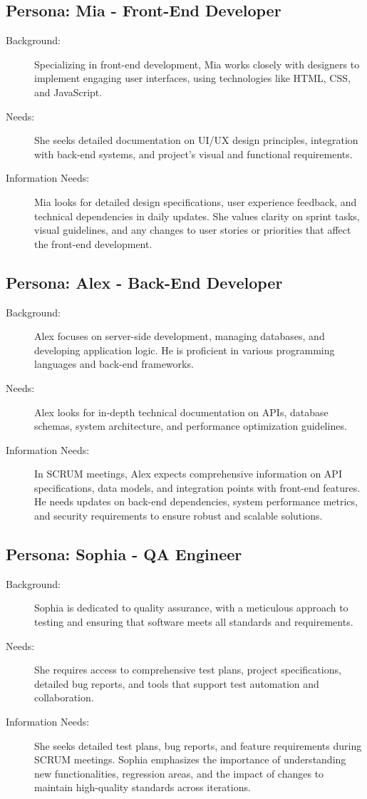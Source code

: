 \subsection*{Persona: Mia - Front-End Developer}
\begin{description}
    \item[Background:] Specializing in front-end development, Mia works closely with designers to implement engaging user interfaces, using technologies like HTML, CSS, and JavaScript.
    \item[Needs:] She seeks detailed documentation on UI/UX design principles, integration with back-end systems, and project's visual and functional requirements.
    \item[Information Needs:] Mia looks for detailed design specifications, user experience feedback, and technical dependencies in daily updates. She values clarity on sprint tasks, visual guidelines, and any changes to user stories or priorities that affect the front-end development.
\end{description}

\subsection*{Persona: Alex - Back-End Developer}
\begin{description}
    \item[Background:] Alex focuses on server-side development, managing databases, and developing application logic. He is proficient in various programming languages and back-end frameworks.
    \item[Needs:] Alex looks for in-depth technical documentation on APIs, database schemas, system architecture, and performance optimization guidelines.
    \item[Information Needs:] In SCRUM meetings, Alex expects comprehensive information on API specifications, data models, and integration points with front-end features. He needs updates on back-end dependencies, system performance metrics, and security requirements to ensure robust and scalable solutions.
\end{description}

\subsection*{Persona: Sophia - QA Engineer}
\begin{description}
    \item[Background:] Sophia is dedicated to quality assurance, with a meticulous approach to testing and ensuring that software meets all standards and requirements.
    \item[Needs:] She requires access to comprehensive test plans, project specifications, detailed bug reports, and tools that support test automation and collaboration.
    \item[Information Needs:] She seeks detailed test plans, bug reports, and feature requirements during SCRUM meetings. Sophia emphasizes the importance of understanding new functionalities, regression areas, and the impact of changes to maintain high-quality standards across iterations.
\end{description}

